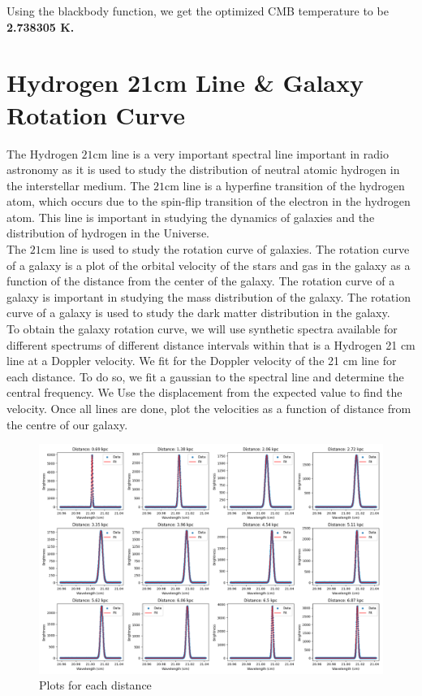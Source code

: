 Using the blackbody function, we get the optimized CMB temperature to be \textbf{2.738305 K.}

\clearpage

\section{Hydrogen 21cm Line \& Galaxy Rotation Curve}

The Hydrogen $21$cm line is a very important spectral line important in radio astronomy as it is used to study the distribution of neutral atomic hydrogen in the interstellar medium. The $21$cm line is a hyperfine transition of the hydrogen atom, which occurs due to the spin-flip transition of the electron in the hydrogen atom. This line is important in studying the dynamics of galaxies and the distribution of hydrogen in the Universe. \\

The $21$cm line is used to study the rotation curve of galaxies. The rotation curve of a galaxy is a plot of the orbital velocity of the stars and gas in the galaxy as a function of the distance from the center of the galaxy. The rotation curve of a galaxy is important in studying the mass distribution of the galaxy. The rotation curve of a galaxy is used to study the dark matter distribution in the galaxy. \\

To obtain the galaxy rotation curve, we will use synthetic spectra available for different spectrums of different distance intervals within that is a Hydrogen 21 cm line at a Doppler velocity. We fit for the Doppler velocity of the 21 cm line for each distance. To do so, we fit a gaussian to the spectral line and determine the central frequency. We Use the displacement from the expected value to find the velocity. Once all lines are done, plot the velocities as a function of distance from the centre of our galaxy.

\begin{figure}[H]
	\centering
	\includegraphics[width=\textwidth]{Images/12_files.png}
	\caption{Plots for each distance}
	\label{fig:12_files}
\end{figure}

